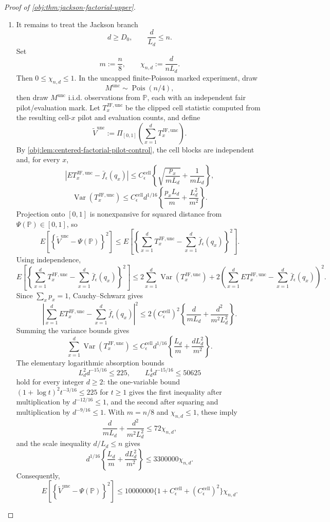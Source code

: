 \begin{proof}[Proof of \cref{obj:thm:jackson-factorial-upper}]
\begin{enumerate}
\item It remains to treat the Jackson branch
\[
d\ge D_0,
\qquad
\frac{d}{L_d}\le n .
\]
Set
\[
m:=\frac n8,
\qquad
\chi_{n,d}:=\frac{d}{nL_d}.
\]
Then \(0\le\chi_{n,d}\le1\).  In the uncapped finite-Poisson marked
experiment, draw
\[
M^{\mathrm{unc}}\sim\operatorname{Pois}(n/4),
\]
then draw \(M^{\mathrm{unc}}\) i.i.d. observations from \(\mathbb P\), each
with an independent fair pilot/evaluation mark.  Let
\(T_x^{\mathrm{JF},\mathrm{unc}}\) be the clipped cell statistic computed from
the resulting cell-\(x\) pilot and evaluation counts, and define
\[
\widetilde V^{\mathrm{unc}}
:=
\Pi_{[0,1]}
\left(
\sum_{x=1}^d T_x^{\mathrm{JF},\mathrm{unc}}
\right).
\]
By \cref{obj:lem:centered-factorial-pilot-control}, the cell blocks are
independent and, for every \(x\),
\[
\left|
E T_x^{\mathrm{JF},\mathrm{unc}}-\bar f_\epsilon(q_x)
\right|
\le
C_{\epsilon}^{\mathrm{cell}}
\left\{
\sqrt{\frac{p_x}{mL_d}}+\frac{1}{mL_d}
\right\},
\]
\[
\operatorname{Var}(T_x^{\mathrm{JF},\mathrm{unc}})
\le
C_{\epsilon}^{\mathrm{cell}}d^{1/16}
\left\{
\frac{p_xL_d}{m}+\frac{L_d^2}{m^2}
\right\}.
\]
Projection onto \([0,1]\) is nonexpansive for squared distance from
\(\Psi(\mathbb P)\in[0,1]\), so
\[
E\left[
\left\{\widetilde V^{\mathrm{unc}}-\Psi(\mathbb P)\right\}^2
\right]
\le
E\left[
\left\{
\sum_{x=1}^dT_x^{\mathrm{JF},\mathrm{unc}}
-\sum_{x=1}^d\bar f_\epsilon(q_x)
\right\}^2
\right].
\]
Using independence,
\[
E\left[
\left\{
\sum_{x=1}^dT_x^{\mathrm{JF},\mathrm{unc}}
-\sum_{x=1}^d\bar f_\epsilon(q_x)
\right\}^2
\right]
\le
2\sum_{x=1}^d\operatorname{Var}(T_x^{\mathrm{JF},\mathrm{unc}})
+
2\left(
\sum_{x=1}^dET_x^{\mathrm{JF},\mathrm{unc}}
-\sum_{x=1}^d\bar f_\epsilon(q_x)
\right)^2 .
\]
Since \(\sum_x p_x=1\), Cauchy--Schwarz gives
\[
\left|
\sum_{x=1}^dET_x^{\mathrm{JF},\mathrm{unc}}
-\sum_{x=1}^d\bar f_\epsilon(q_x)
\right|^2
\le
2(C_{\epsilon}^{\mathrm{cell}})^2
\left\{
\frac{d}{mL_d}+\frac{d^2}{m^2L_d^2}
\right\}.
\]
Summing the variance bounds gives
\[
\sum_{x=1}^d\operatorname{Var}(T_x^{\mathrm{JF},\mathrm{unc}})
\le
C_{\epsilon}^{\mathrm{cell}}d^{1/16}
\left\{
\frac{L_d}{m}+\frac{dL_d^2}{m^2}
\right\}.
\]
The elementary logarithmic absorption bounds
\[
L_d^2d^{-15/16}\le225,
\qquad
L_d^4d^{-15/16}\le50625
\]
hold for every integer \(d\ge2\): the one-variable bound
\((1+\log t)^2t^{-3/16}\le225\) for \(t\ge1\) gives the first inequality after
multiplication by \(d^{-12/16}\le1\), and the second after squaring and
multiplication by \(d^{-9/16}\le1\).  With \(m=n/8\) and
\(\chi_{n,d}\le1\), these imply
\[
\frac{d}{mL_d}+\frac{d^2}{m^2L_d^2}
\le
72\chi_{n,d},
\]
and the scale inequality \(d/L_d\le n\) gives
\[
d^{1/16}
\left\{
\frac{L_d}{m}+\frac{dL_d^2}{m^2}
\right\}
\le
3300000\chi_{n,d}.
\]
Consequently,
\[
E\left[
\left\{\widetilde V^{\mathrm{unc}}-\Psi(\mathbb P)\right\}^2
\right]
\le
10000000
\{1+C_{\epsilon}^{\mathrm{cell}}+(C_{\epsilon}^{\mathrm{cell}})^2\}
\chi_{n,d}.
\]


\end{enumerate}
\end{proof}

